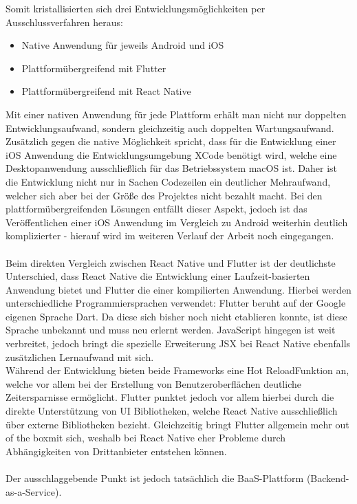 Somit kristallisierten sich drei Entwicklungsmöglichkeiten per Ausschlussverfahren heraus:
\begin{itemize}
	\item Native Anwendung für jeweils Android und iOS
	\item Plattformübergreifend mit Flutter
	\item Plattformübergreifend mit React Native
\end{itemize}

Mit einer nativen Anwendung für jede Plattform erhält man nicht nur doppelten Entwicklungsaufwand, sondern gleichzeitig auch doppelten Wartungsaufwand. 
Zusätzlich gegen die native Möglichkeit spricht, dass für die Entwicklung einer iOS Anwendung die Entwicklungsumgebung XCode benötigt wird, welche eine Desktopanwendung ausschließlich für das Betriebssystem macOS ist.
Daher ist die Entwicklung nicht nur in Sachen Codezeilen ein deutlicher Mehraufwand, welcher sich aber bei der Größe des Projektes nicht bezahlt macht.
Bei den plattformübergreifenden Lösungen entfällt dieser Aspekt, jedoch ist das Veröffentlichen einer iOS Anwendung im Vergleich zu Android weiterhin deutlich komplizierter - hierauf wird im weiteren Verlauf der Arbeit noch eingegangen.\\
\\
Beim direkten Vergleich zwischen React Native und Flutter ist der deutlichste Unterschied, dass React Native die Entwicklung einer Laufzeit-basierten Anwendung bietet und Flutter die einer kompilierten Anwendung.
Hierbei werden unterschiedliche Programmiersprachen verwendet: Flutter beruht auf der Google eigenen Sprache Dart. 
Da diese sich bisher noch nicht etablieren konnte, ist diese Sprache unbekannt und muss neu erlernt werden.
JavaScript hingegen ist weit verbreitet, jedoch bringt die spezielle Erweiterung JSX bei React Native ebenfalls zusätzlichen Lernaufwand mit sich.\\
Während der Entwicklung bieten beide Frameworks eine \glqq Hot Reload\grqq Funktion an, welche vor allem bei der Erstellung von Benutzeroberflächen deutliche Zeitersparnisse ermöglicht.
Flutter punktet jedoch vor allem hierbei durch die direkte Unterstützung von UI Bibliotheken, welche React Native ausschließlich über externe Bibliotheken bezieht. 
Gleichzeitig bringt Flutter allgemein mehr \glqq out of the box\grqq mit sich, weshalb bei React Native eher Probleme durch Abhängigkeiten von Drittanbieter entstehen können. \\
\\
Der ausschlaggebende Punkt ist jedoch tatsächlich die BaaS-Plattform (Backend-as-a-Service).
